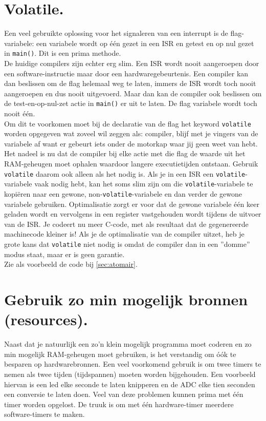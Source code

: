\documentclass[12pt,a4paper,final,oneside,fleqn]{article}
\begin{document}
\section{Volatile.}
Een veel gebruikte oplossing voor het signaleren van een interrupt is
de flag-variabele: een variabele wordt op \'{e}\'{e}n gezet in een ISR
en getest en op nul gezet in \texttt{main()}. Dit is een prima methode. \\
De huidige compilers zijn echter erg slim. Een ISR wordt nooit aangeroepen
door een software-instructie maar door een hardwaregebeurtenis. Een compiler
kan dan beslissen om de flag helemaal weg te laten, immers de ISR wordt toch
nooit aangeroepen en dus nooit uitgevoerd. Maar dan kan de compiler ook
beslissen om de test-en-op-nul-zet actie in \texttt{main()} er uit te laten.
De flag variabele wordt toch nooit \'{e}\'{e}n. \\
Om dit te voorkomen moet bij de declaratie van de flag het keyword
\texttt{volatile} worden opgegeven wat zoveel wil zeggen als: compiler, blijf
met je vingers van de variabele af want er gebeurt iets onder de motorkap
waar jij geen weet van hebt. \\
Het nadeel is nu dat de compiler bij elke actie
met die flag de waarde uit het RAM-geheugen moet ophalen waardoor langere
executietijden ontstaan. Gebruik \texttt{volatile} daarom ook alleen als het
nodig is. Als je in een ISR een \texttt{volatile}-variabele vaak nodig hebt,
kan het soms slim zijn om die \texttt{volatile}-variabele te kopi\"{e}ren
naar een gewone, non-\texttt{volatile}-variabele en dan verder de
gewone variabele gebruiken. Optimalisatie zorgt er voor dat de gewone
variabele \'{e}\'{e}n keer geladen wordt en vervolgens in een register
vastgehouden wordt tijdens de uitvoer van de ISR. Je codeert nu meer
C-code, met als resultaat dat de gegenereerde machinecode kleiner is!
Als je de optimalisatie van de compiler uitzet, heb je grote kans dat
\texttt{volatile} niet nodig is omdat de compiler dan in een ''domme'' modus
staat, maar er is geen garantie. \\
Zie als voorbeeld de code bij \ref{sec:atomair}.


\section{Gebruik zo min mogelijk bronnen (resources).}
Naast dat je natuurlijk een zo'n klein mogelijk programma moet coderen en zo min
mogelijk RAM-geheugen moet gebruiken, is het verstandig om \'{o}\'{o}k te
besparen op hardwarebronnen. Een veel voorkomend gebruik is om twee timers
te nemen als twee tijden (tijdspannen) moeten worden bijgehouden. Een voorbeeld
hiervan is een led elke seconde te laten knipperen en de ADC elke tien seconden
een conversie te laten doen. Veel van deze problemen kunnen prima met
\'{e}\'{e}n timer worden opgelost. De truuk is om met \'{e}\'{e}n
hardware-timer meerdere software-timers te maken. \\
\end{document}
